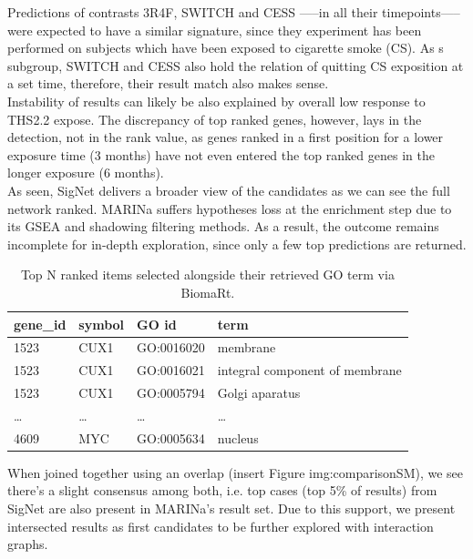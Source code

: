 Predictions of contrasts 3R4F, SWITCH and CESS —--in all their timepoints—-- were expected to have a similar signature, since they experiment has been performed on subjects which have been exposed to cigarette smoke (CS). As s subgroup, SWITCH and CESS also hold the relation of quitting CS exposition at a set time, therefore, their result match also makes sense.
\\

Instability of results can likely be also explained by overall low response to THS2.2 expose. The discrepancy of top ranked genes, however, lays in the detection, not in the rank value, as genes ranked in a first position for a lower exposure time (3 months) have not even entered the top ranked genes in the longer exposure (6 months).
\\

As seen, SigNet delivers a broader view of the candidates as we can see the full network ranked. MARINa suffers hypotheses loss at the enrichment step due to its GSEA and shadowing filtering methods. As a result, the outcome remains incomplete for in-depth exploration, since only a few top predictions are returned.
\\

\begin{table}[h]
\centering
\begin{tabular}{|l|l|l|l|}
\hline
gene\_id & symbol & GO id      & term                           \\ \hline
1523     & CUX1   & GO:0016020 & membrane                       \\ \hline
1523     & CUX1   & GO:0016021 & integral component of membrane \\ \hline
1523     & CUX1   & GO:0005794 & Golgi aparatus                 \\ \hline
…        & …      & …          & …                              \\ \hline
4609     & MYC    & GO:0005634 & nucleus                        \\ \hline
\end{tabular}
\caption{Top N ranked items selected alongside their retrieved GO term via BiomaRt.}
\label{tbl:goterms}
\end{table}

When joined together using an overlap (insert Figure img:comparisonSM), we see there’s a slight consensus among both, i.e. top cases (top 5\% of results) from SigNet are also present in MARINa’s result set. Due to this support, we present intersected results as first candidates to be further explored with interaction graphs.
\\


